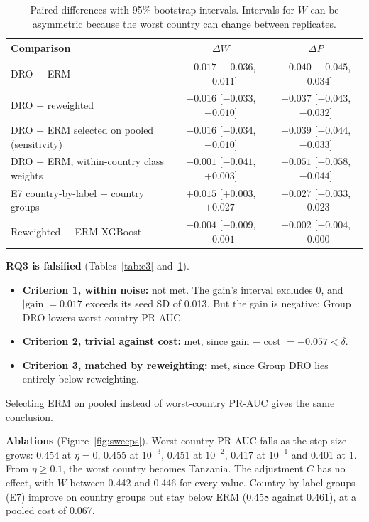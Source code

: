 \documentclass[11pt]{article}
\begin{document}
\begin{table}[H]
  \centering
  \small
  \caption{Paired differences with 95\% bootstrap intervals. Intervals for $W$ can be asymmetric because the worst country can change between replicates.}
  \label{tab:e3paired}
  \begin{tabular}{lcc}
    \toprule
    Comparison & $\Delta W$ & $\Delta P$ \\
    \midrule
    DRO $-$ ERM                                  & $-0.017$ [$-0.036$, $-0.011$] & $-0.040$ [$-0.045$, $-0.034$] \\
    DRO $-$ reweighted                           & $-0.016$ [$-0.033$, $-0.010$] & $-0.037$ [$-0.043$, $-0.032$] \\
    DRO $-$ ERM selected on pooled (sensitivity) & $-0.016$ [$-0.034$, $-0.010$] & $-0.039$ [$-0.044$, $-0.033$] \\
    DRO $-$ ERM, within-country class weights    & $-0.001$ [$-0.041$, $+0.003$] & $-0.051$ [$-0.058$, $-0.044$] \\
    E7 country-by-label $-$ country groups       & $+0.015$ [$+0.003$, $+0.027$] & $-0.027$ [$-0.033$, $-0.023$] \\
    Reweighted $-$ ERM XGBoost                   & $-0.004$ [$-0.009$, $-0.001$] & $-0.002$ [$-0.004$, $-0.000$] \\
    \bottomrule
  \end{tabular}
\end{table}

\textbf{RQ3 is falsified} (Tables~\ref{tab:e3} and~\ref{tab:e3paired}).
\begin{itemize}
  \item \textbf{Criterion 1, within noise:} not met. The gain's interval excludes 0, and $|\text{gain}| = 0.017$ exceeds its seed SD of 0.013. But the gain is negative: Group DRO lowers worst-country PR-AUC.
  \item \textbf{Criterion 2, trivial against cost:} met, since gain $-$ cost $= -0.057 < \delta$.
  \item \textbf{Criterion 3, matched by reweighting:} met, since Group DRO lies entirely below reweighting.
\end{itemize}
Selecting ERM on pooled instead of worst-country PR-AUC gives the same conclusion.

\textbf{Ablations} (Figure~\ref{fig:sweeps}). Worst-country PR-AUC falls as the step size grows: 0.454 at $\eta = 0$, 0.455 at $10^{-3}$, 0.451 at $10^{-2}$, 0.417 at $10^{-1}$ and 0.401 at 1. From $\eta \geq 0.1$, the worst country becomes Tanzania. The adjustment $C$ has no effect, with $W$ between 0.442 and 0.446 for every value. Country-by-label groups (E7) improve on country groups but stay below ERM (0.458 against 0.461), at a pooled cost of 0.067.
\end{document}
